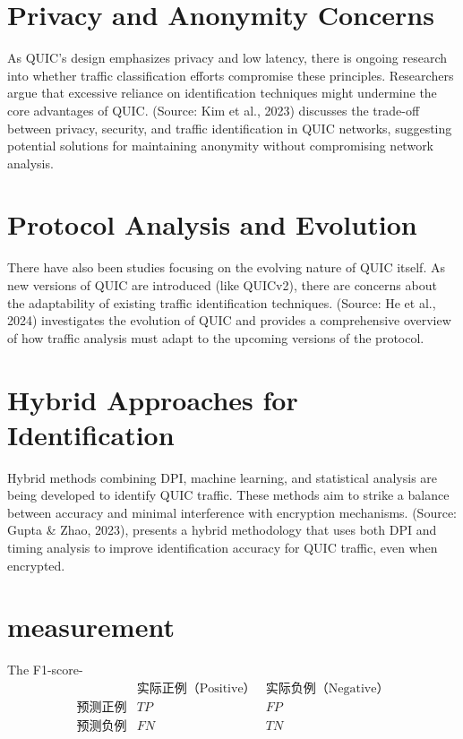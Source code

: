 \documentclass[a4paper, 10pt]{article}
\begin{document}
\section{Privacy and Anonymity Concerns}
As QUIC's design emphasizes privacy and low latency, there is ongoing research into whether traffic classification efforts compromise these principles. Researchers argue that excessive reliance on identification techniques might undermine the core advantages of QUIC.
(Source: Kim et al., 2023) discusses the trade-off between privacy, security, and traffic identification in QUIC networks, suggesting potential solutions for maintaining anonymity without compromising network analysis.
\section{Protocol Analysis and Evolution}
There have also been studies focusing on the evolving nature of QUIC itself. As new versions of QUIC are introduced (like QUICv2), there are concerns about the adaptability of existing traffic identification techniques.
(Source: He et al., 2024) investigates the evolution of QUIC and provides a comprehensive overview of how traffic analysis must adapt to the upcoming versions of the protocol.

\section{Hybrid Approaches for Identification}
Hybrid methods combining DPI, machine learning, and statistical analysis are being developed to identify QUIC traffic. These methods aim to strike a balance between accuracy and minimal interference with encryption mechanisms.
(Source: Gupta \& Zhao, 2023), presents a hybrid methodology that uses both DPI and timing analysis to improve identification accuracy for QUIC traffic, even when encrypted.

\section{measurement}
The F1-score-
\[
	\begin{array}{c|c|c}
		\text{}     & \text{实际正例（Positive）} & \text{实际负例（Negative）} \\
		\hline
		\text{预测正例} & TP                    & FP                    \\
		\text{预测负例} & FN                    & TN                    \\
	\end{array}
\]
\end{document}
